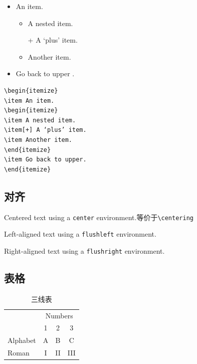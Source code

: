 \documentclass[a4paper]{article} %
\numberwithin{equation}{section} %
\begin{document}
\begin{minipage}{0.5\textwidth}
\begin{itemize}
\item An item.
\begin{itemize}
\item A nested item.
\item[+] A ‘plus’ item.
\item Another item.
\end{itemize}
\item Go back to upper .
\end{itemize}
\end{minipage}
\begin{minipage}{0.5\textwidth}
\begin{verbatim}
\begin{itemize}
\item An item.
\begin{itemize}
\item A nested item.
\item[+] A ‘plus’ item.
\item Another item.
\end{itemize}
\item Go back to upper.
\end{itemize}
\end{verbatim}
\end{minipage}

\subsection{对齐}
\begin{center}
Centered text using a
\verb|center| environment.等价于\verb|\centering|
\end{center}
\begin{flushleft}
Left-aligned text using a
\verb|flushleft| environment.%
\end{flushleft}
\begin{flushright}
Right-aligned text using a
\verb|flushright| environment.
\end{flushright}

\subsection{表格}
\begin{table}[htbp]
\centering
\begin{tabular}{p{5cm}ccc}
\toprule 
& \multicolumn{3}{c}{Numbers} \\
\cmidrule{2-4} 
& 1 & 2 & 3 \\
\midrule
Alphabet & A & B & C \\
Roman & I & II& III \\
\bottomrule 
\end{tabular}
\caption{三线表} 
\end{table}
\end{document}
